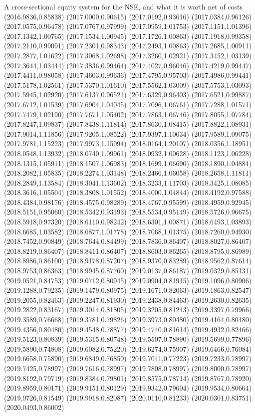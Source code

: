 \documentclass[aspectratio=169,10pt]{beamer}
\begin{document}
\begin{frame}[t]{A cross-sectional equity system for the NSE, and what it is worth net of costs}
(2016.9836,0.85838) (2017.0000,0.90615) (2017.0192,0.93616) (2017.0384,0.96126) (2017.0575,0.96478) (2017.0767,0.97999) (2017.0959,1.01753) (2017.1151,1.01396) (2017.1342,1.00765) (2017.1534,1.00945) (2017.1726,1.00863) (2017.1918,0.99358) (2017.2110,0.99091) (2017.2301,0.98343) (2017.2493,1.00863) (2017.2685,1.00911) (2017.2877,1.01622) (2017.3068,1.02698) (2017.3260,1.02921) (2017.3452,1.03139) (2017.3644,1.03444) (2017.3836,0.99464) (2017.4027,0.96046) (2017.4219,0.99447) (2017.4411,0.98058) (2017.4603,0.99636) (2017.4795,0.95703) (2017.4986,0.99441) (2017.5178,1.02561) (2017.5370,1.01610) (2017.5562,1.03009) (2017.5753,1.03093) (2017.5945,1.02920) (2017.6137,0.96521) (2017.6329,0.96403) (2017.6521,0.99887) (2017.6712,1.01539) (2017.6904,1.04045) (2017.7096,1.06761) (2017.7288,1.01571) (2017.7479,1.02190) (2017.7671,1.05402) (2017.7863,1.06746) (2017.8055,1.07784) (2017.8247,1.09837) (2017.8438,1.11814) (2017.8630,1.08415) (2017.8822,1.08931) (2017.9014,1.11856) (2017.9205,1.08522) (2017.9397,1.10634) (2017.9589,1.09075) (2017.9781,1.15223) (2017.9973,1.15094) (2018.0164,1.20107) (2018.0356,1.18951) (2018.0548,1.13932) (2018.0740,1.09961) (2018.0932,1.00628) (2018.1123,1.06228) (2018.1315,1.05911) (2018.1507,1.06983) (2018.1699,1.06690) (2018.1890,1.04884) (2018.2082,1.05835) (2018.2274,1.03148) (2018.2466,1.06058) (2018.2658,1.11811) (2018.2849,1.13584) (2018.3041,1.13602) (2018.3233,1.11703) (2018.3425,1.08085) (2018.3616,1.05504) (2018.3808,1.01552) (2018.4000,1.04844) (2018.4192,0.97588) (2018.4384,0.98176) (2018.4575,0.98289) (2018.4767,0.95599) (2018.4959,0.92945) (2018.5151,0.95060) (2018.5342,0.93193) (2018.5534,0.95149) (2018.5726,0.96675) (2018.5918,0.97320) (2018.6110,0.98242) (2018.6301,1.00871) (2018.6493,1.03893) (2018.6685,1.03582) (2018.6877,1.01778) (2018.7068,1.01375) (2018.7260,0.94930) (2018.7452,0.90849) (2018.7644,0.84499) (2018.7836,0.86407) (2018.8027,0.86407) (2018.8219,0.86407) (2018.8411,0.86407) (2018.8603,0.86265) (2018.8795,0.86989) (2018.8986,0.86100) (2018.9178,0.87207) (2018.9370,0.83289) (2018.9562,0.87614) (2018.9753,0.86363) (2018.9945,0.87760) (2019.0137,0.86187) (2019.0329,0.85131) (2019.0521,0.84753) (2019.0712,0.80945) (2019.0904,0.81915) (2019.1096,0.80906) (2019.1288,0.79235) (2019.1479,0.80975) (2019.1671,0.82063) (2019.1863,0.82547) (2019.2055,0.82463) (2019.2247,0.81930) (2019.2438,0.84463) (2019.2630,0.82635) (2019.2822,0.83167) (2019.3014,0.81805) (2019.3205,0.81243) (2019.3397,0.79966) (2019.3589,0.76668) (2019.3781,0.79826) (2019.3973,0.80480) (2019.4164,0.80480) (2019.4356,0.80480) (2019.4548,0.78877) (2019.4740,0.81614) (2019.4932,0.82466) (2019.5123,0.80839) (2019.5315,0.80748) (2019.5507,0.78890) (2019.5699,0.77896) (2019.5890,0.74808) (2019.6082,0.75220) (2019.6274,0.75907) (2019.6466,0.76084) (2019.6658,0.75890) (2019.6849,0.76850) (2019.7041,0.77223) (2019.7233,0.78997) (2019.7425,0.78997) (2019.7616,0.78997) (2019.7808,0.78997) (2019.8000,0.78997) (2019.8192,0.79719) (2019.8384,0.79801) (2019.8575,0.78714) (2019.8767,0.78920) (2019.8959,0.80171) (2019.9151,0.80129) (2019.9342,0.79604) (2019.9534,0.80664) (2019.9726,0.81549) (2019.9918,0.82087) (2020.0110,0.81233) (2020.0301,0.83751) (2020.0493,0.86002) 
\end{frame}
\end{document}
